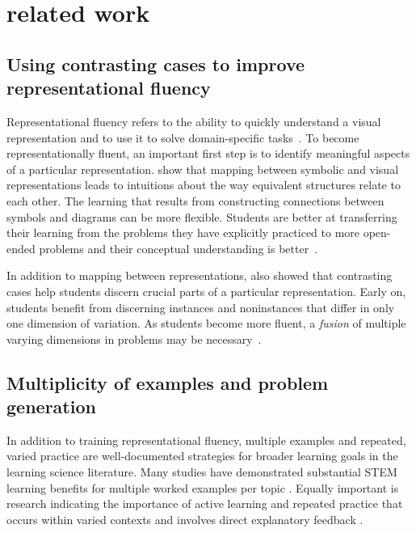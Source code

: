 

\section{\Edgworth related work}
\label{sec:edgeworth-related}

\subsection{Using contrasting cases to improve representational fluency}

Representational fluency refers to the ability to quickly understand a visual representation and to use it to solve domain-specific tasks~\cite{multipleReps}. To become representationally fluent, an important first step is to identify meaningful aspects of a particular representation. \citet{perceptualLearning} show that mapping between symbolic and visual representations leads to intuitions about the way equivalent structures relate to each other. The learning that results from constructing connections between symbols and diagrams can be more flexible. Students are better at transferring their learning from the problems they have explicitly practiced to more open-ended problems and their conceptual understanding is better~\cite{25learning}. 

In addition to mapping between representations, \citet{samenessAndDifference} also showed that contrasting cases help students discern crucial parts of a particular representation. Early on, students benefit from discerning instances and noninstances that differ in only one dimension of variation. As students become more fluent, a \emph{fusion} of multiple varying dimensions in problems may be necessary~\cite{fusion}.

\subsection{Multiplicity of examples and problem generation}

In addition to training representational fluency, multiple examples and repeated, varied practice are well-documented strategies for broader learning goals in the learning science literature. Many studies have demonstrated substantial STEM learning benefits for multiple worked examples per topic \cite{PBB07}. Equally important is research indicating the importance of active learning \cite{CW14, DMM19} and repeated practice \cite{deliberatePractice, SSL98} that occurs within varied contexts \cite{PV94, RT07} and involves direct explanatory feedback \cite{perceptualLearning}.

